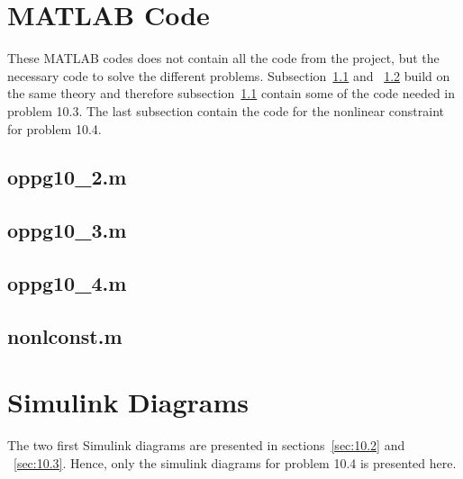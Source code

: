 \appendix

\section{MATLAB Code}\label{sec:matlab}

These MATLAB codes does not contain all the code from the project, but the necessary code to solve the different problems. Subsection~\ref{subsec:10_2_m} and ~\ref{subsec:10_3_m} build on the same theory and therefore subsection~\ref{subsec:10_2_m} contain some of the code needed in problem 10.3. The last subsection contain the code for the nonlinear constraint for problem 10.4.

\subsection{oppg10\_2.m}\label{subsec:10_2_m}

\subsection{oppg10\_3.m}\label{subsec:10_3_m}

\subsection{oppg10\_4.m}\label{subsec:10_4_m}

\subsection{nonlconst.m}\label{subsec:nonlconst_m}


\section{Simulink Diagrams}\label{sec:simulink}
The two first Simulink diagrams are presented in sections~\ref{sec:10.2} and ~\ref{sec:10.3}. Hence, only the simulink diagrams for problem 10.4 is presented here.

